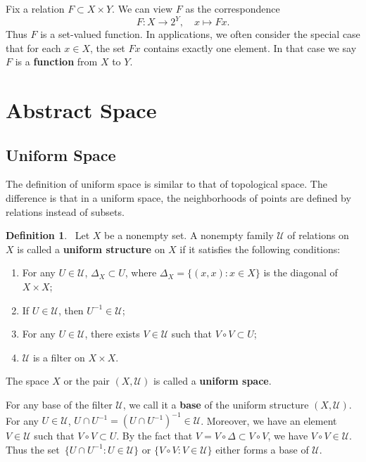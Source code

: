 \documentclass[12pt,a4paper,draft]{article}  %
\theoremstyle{definition}
\newtheorem{definition}{Definition}[section]
\numberwithin{equation}{section}
\begin{document}
Fix a relation $F\subset X\times Y$. We can view $F$ as the correspondence
$$ F:X \rightarrow 2^Y, \quad x \mapsto Fx. $$
Thus $F$ is a set-valued function. In applications, we often consider the special case that for each $x\in X$, the set $Fx$ contains exactly one element. In that case we say $F$ is a \textbf{function} from $X$ to $Y$.

\section{Abstract Space}

\subsection{Uniform Space}
The definition of uniform space is similar to that of topological space. The difference is that in a uniform space, the neighborhoods of points are defined by relations instead of subsets.
\begin{definition}~\label{def2.1}   
    Let $X$ be a nonempty set. A nonempty family $\mathcal{U}$ of relations on $X$ is called a \textbf{uniform structure} on $X$ if it satisfies the following conditions:
    \begin{enumerate}
        \item For any $U \in \mathcal{U}$, $\Delta_X \subset U$, where $\Delta_X = \{(x,x): x \in X\}$ is the diagonal of $X \times X$;
        \item If $U \in \mathcal{U}$, then $U^{-1} \in \mathcal{U}$;
        \item For any $U \in \mathcal{U}$, there exists $V \in \mathcal{U}$ such that $V \circ V \subset U$;
        \item $\mathcal{U}$ is a filter on $X \times X$.
    \end{enumerate}
    The space $X$ or the pair $(X,\mathcal{U})$ is called a \textbf{uniform space}.
\end{definition}
For any base of the filter $\mathcal{U}$, we call it a \textbf{base} of the uniform structure $(X,\mathcal{U})$.
For any $U \in \mathcal{U}$, $U \cap U^{-1} = (U \cap U^{-1})^{-1} \in \mathcal{U}$.
Moreover, we have an element $V \in \mathcal{U}$ such that $V \circ V \subset U$. 
By the fact that $V=V \circ \Delta \subset V \circ V  $, 
we have $V \circ V \in \mathcal{U}$. Thus the set~$\{U \cap U^{-1}:U \in \mathcal{U}\}$ 
or $\{V \circ V:V \in \mathcal{U}\}$ either forms a base of $\mathcal{U}$.
\end{document}
